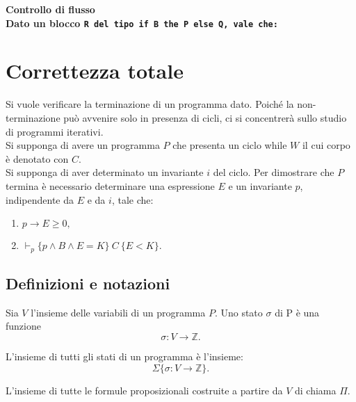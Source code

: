 \begin{prooftree}
\end{prooftree}
{\bf Controllo di flusso\rm\\
Dato un blocco \tt R \rm del tipo \tt if B the P else Q\rm, vale che:

\begin{prooftree}
\end{prooftree}
\newpage
\section{Correttezza totale}
Si vuole verificare la terminazione di un programma dato. Poich\'e la non-terminazione pu\`o avvenire solo in presenza di cicli, ci si concentrer\`a sullo studio di programmi iterativi.\\
Si supponga di avere un programma $P$ che presenta un ciclo while $W$ il cui corpo \`e denotato con $C$. \\
Si supponga di aver determinato un invariante $i$ del ciclo. Per dimostrare che $P$ termina \`e necessario determinare una espressione $E$ e un invariante $p$, indipendente da $E$ e da $i$, tale che:
\begin{enumerate}
	\item $ p \rightarrow E \geq 0,$
	\item $ \vdash_p \{ p \land B \land E=K  \}\ C\ \{E < K\}.  $
\end{enumerate}

\subsection{Definizioni e notazioni}
\begin{deff}
	Sia $V$ l'insieme delle variabili di un programma $P$. Uno stato $\sigma$ di P \`e una funzione $$\sigma: V \rightarrow \mathbb{Z}.$$
\end{deff}

\begin{deff}
	L'insieme di tutti gli stati di un programma \`e l'insieme: $$\Sigma \{\sigma:V\rightarrow \mathbb{Z}\}.$$
\end{deff}

\begin{deff}
	L'insieme di tutte le formule proposizionali costruite a partire da $V$ di chiama $\Pi$.
\end{deff}

}
